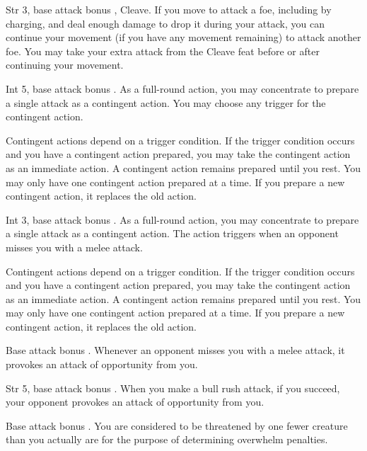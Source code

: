  Str 3, base attack bonus , Cleave.
 If you move to attack a foe, including by charging, and deal enough damage to drop it during your attack, you can continue your movement (if you have any movement remaining) to attack another foe. You may take your extra attack from the Cleave feat before or after continuing your movement.

\featpre Int 5, base attack bonus .
\featben As a full-round action, you may concentrate to prepare a single attack as a contingent action. You may choose any trigger for the contingent action.

Contingent actions depend on a trigger condition. If the trigger condition occurs and you have a contingent action prepared, you may take the contingent action as an immediate action. A contingent action remains prepared until you rest. You may only have one contingent action prepared at a time. If you prepare a new contingent action, it replaces the old action.

\featpre Int 3, base attack bonus .
\featben As a full-round action, you may concentrate to prepare a single attack as a contingent action. The action triggers when an opponent misses you with a melee attack.

Contingent actions depend on a trigger condition. If the trigger condition occurs and you have a contingent action prepared, you may take the contingent action as an immediate action. A contingent action remains prepared until you rest. You may only have one contingent action prepared at a time. If you prepare a new contingent action, it replaces the old action.

\featpre Base attack bonus .
\featben Whenever an opponent misses you with a melee attack, it provokes an attack of opportunity from you.

\featpre Str 5, base attack bonus .
\featben When you make a bull rush attack, if you succeed, your opponent provokes an attack of opportunity from you.

 Base attack bonus .
 You are considered to be threatened by one fewer creature than you actually are for the purpose of determining overwhelm penalties.

